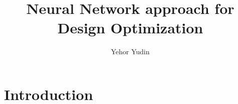 \documentclass[]{article}
\title{Neural Network approach for Design Optimization}
\author{Yehor Yudin}
\begin{document}
\maketitle

\begin{abstract}

\end{abstract}

\section{Introduction}

\end{document}
